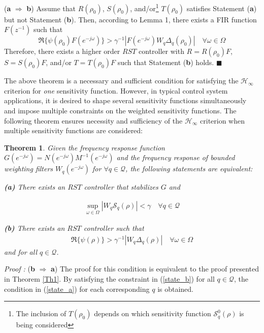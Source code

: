 \documentclass[journal]{IEEEtran}
\newtheorem{theorem}{Theorem}
\newcommand{\jo}{(e^{-j\omega})}
\begin{document}
({\bf a} $\Rightarrow$ {\bf b}) Assume that $R(\rho_0)$,  $S(\rho_0)$, and/or\footnote{The inclusion of $T(\rho_0)$ depends on which sensitivity function $\mathcal{S}_q^0(\rho)$ is being considered} $T(\rho_0)$ satisfies Statement ({\bf a}) but not Statement ({\bf b}). Then, according to Lemma 1, there exists a FIR function $F(z^{-1})$ such that
\begin{equation} \label{eq:the_ineq1}
\Re\{ \psi(\rho_0) F(e^{-j\omega})\} > \gamma^{-1}|F(e^{-j\omega})W_q\Delta_q(\rho_0)| \quad \forall \omega \in \Omega
\end{equation}
Therefore, there exists a higher order $RST$ controller with $R= R(\rho_0)F$, $S = S(\rho_0)F$, and/or $T = T(\rho_0)F$ such that Statement ({\bf b}) holds.
 {\hfill \ensuremath{\blacksquare}}

The above theorem is a necessary and sufficient condition for satisfying the $\mathcal{H}_\infty$ criterion for \textit{one} sensitivity function. However, in typical control system applications, it is desired to shape several sensitivity functions simultaneously and impose multiple constraints on the weighted sensitivity functions. The following theorem ensures necessity and sufficiency of the $\mathcal{H}_\infty$ criterion when multiple sensitivity functions are considered:

\begin{theorem}  \label{Th2}
Given the frequency response function $G\jo = N\jo M^{-1}\jo$ and the frequency response of bounded weighting filters $W_q\jo$ for $\forall q \in \mathcal{Q}$, the following statements are equivalent: 

{\bf (a)} There exists an $RST$ controller that stabilizes $G$ and 

	\begin{equation}
	\label{state_a}
	\begin{aligned}
	\sup_{\omega \in \Omega}  | {W_q \mathcal{S}_q(\rho)} | < \gamma \quad
	\forall q \in \mathcal{Q}
	\end{aligned}
	\end{equation}
	


{\bf (b)} There exists an $RST$ controller such that
\begin{equation} \label{state_b}
\begin{aligned}
\Re\{\psi(\rho)\}  >\gamma ^{-1}|W_q\Delta_q(\rho)|\quad \forall \omega \in \Omega
 \end{aligned} 
\end{equation}
and for all $q \in \mathcal{Q}$.
\end{theorem}
{\it Proof :} ({\bf b} $\Rightarrow$ {\bf a}) 
The proof for this condition is equivalent to the proof presented in Theorem \ref{Th1}. By satisfying the constraint in (\ref{state_b}) for all $q \in \mathcal{Q}$, the condition in (\ref{state_a}) for each corresponding $q$ is obtained.
\end{document}
